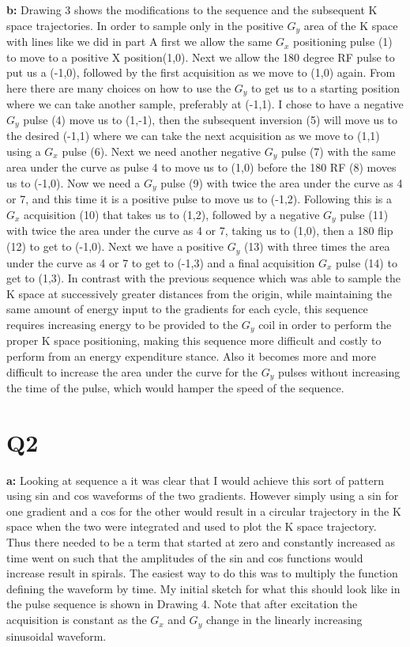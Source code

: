 \documentclass[12pt]{article}
\begin{document}
\noindent\textbf{b: } Drawing 3 shows the modifications to the sequence and the subsequent K space trajectories. In order to sample only in the positive $G_y$ area of the K space with lines like we did in part A first we allow the same $G_x$ positioning pulse (1) to move to a positive X position(1,0). Next we allow the 180 degree RF pulse to put us a (-1,0), followed by the first acquisition as we move to (1,0) again. From here there are many choices on how to use the $G_y$ to get us to a starting position where we can take another sample, preferably at (-1,1). I chose to have a negative $G_y$ pulse (4) move us to (1,-1), then the subsequent inversion (5) will move us to the desired (-1,1) where we can take the next acquisition as we move to (1,1) using a $G_x$ pulse (6). Next we need another negative $G_y$ pulse (7) with the same area under the curve as pulse 4 to move us to (1,0) before the 180 RF (8) moves us to (-1,0). Now we need a $G_y$ pulse (9) with twice the area under the curve as 4 or 7, and this time it is a positive pulse to move us to (-1,2). Following this is a $G_x$ acquisition (10) that takes us to (1,2), followed by a negative $G_y$ pulse (11) with twice the area under the curve as 4 or 7, taking us to (1,0), then a 180 flip (12) to get to (-1,0). Next we have a positive $G_y$ (13) with three times the area under the curve as 4 or 7 to get to (-1,3) and a final acquisition $G_x$ pulse (14) to get to (1,3). In contrast with the previous sequence which was able to sample the K space at successively greater distances from the origin, while maintaining the same amount of energy input to the gradients for each cycle, this sequence requires increasing energy to be provided to the $G_y$ coil in order to perform the proper K space positioning, making this sequence more difficult and costly to perform from an energy expenditure stance. Also it becomes more and more difficult to increase the area under the curve for the $G_y$ pulses without increasing the time of the pulse, which would hamper the speed of the sequence.

\section{Q2}
\noindent\textbf{a: }
Looking at sequence a it was clear that I would achieve this sort of pattern using sin and cos waveforms of the two gradients.  However simply using a sin for one gradient and a cos for the other would result in a circular trajectory in the K space when the two were integrated and used to plot the K space trajectory. Thus there needed to be a term that started at zero and constantly increased as time went on such that the amplitudes of the sin and cos functions would increase result in spirals. The easiest way to do this was to multiply the function defining the waveform by time. My initial sketch for what this should look like in the pulse sequence is shown in Drawing  4. Note that after excitation the acquisition is constant as the $G_x$ and $G_y$ change in the linearly increasing sinusoidal waveform.
\end{document}
